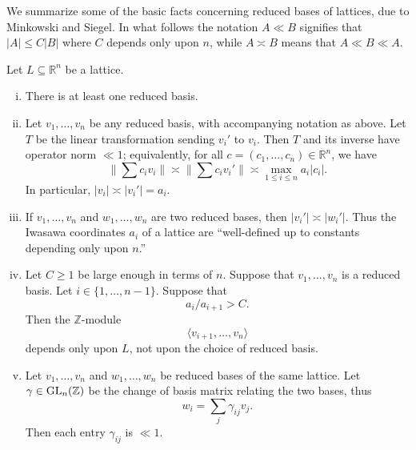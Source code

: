 \documentclass[reqno]{amsart} 
\begin{document}
We summarize some of the basic facts concerning reduced bases of lattices, due to Minkowski and Siegel.  In what follows the notation $A \ll B$ signifies that $|A| \leq C |B|$ where $C$ depends only upon $n$, while $A \asymp B$ means that $A \ll B \ll A$.
\begin{theorem}\label{thm:existence-reduced-basis}
  Let $L \subseteq \mathbb{R}^n$ be a lattice.
  \begin{enumerate} [(i)]
  \item\label{enumerate:cnjdp29fme} There is at least one reduced basis.
  \item\label{enumerate:cnjdp29gt9} Let $v_1,\dotsc,v_n$ be any reduced basis, with accompanying notation as above.  Let $T$ be the linear transformation sending $v_i'$ to $v_i$.  Then $T$ and its inverse have operator norm $\ll 1$; equivalently, for all $c = (c_1,\dotsc,c_n) \in \mathbb{R}^n$, we have
    \begin{equation}\label{eqn:reduced-basis-approx-orth}
      \|\sum c_i v_i\| \asymp
      \|\sum c_i v_i'\|
      \asymp \max_{1 \leq i \leq n} a_i |c_i|.
    \end{equation}
    In particular, $|v_i| \asymp |v_i'| = a_i$.
  \item\label{enumerate:cnjdp29o76} If $v_1,\dotsc,v_n$ and $w_1,\dotsc,w_n$ are two reduced bases, then $|v_i'| \asymp |w_i'|$.  Thus the Iwasawa coordinates $a_i$ of a lattice are ``well-defined up to constants depending only upon $n$.''
  \item\label{enumerate:cnjdp29qgg} Let $C \geq 1$ be large enough in terms of $n$.  Suppose that $v_1,\dotsc,v_n$ is a reduced basis.  Let $i \in \{1, \dotsc, n-1\}$.  Suppose that
    \begin{equation*}
      a_i / a_{i+1} > C.
    \end{equation*}
    Then the $\mathbb{Z}$-module
    \begin{equation*}
      \langle v_{i+1},\dotsc,v_n \rangle
    \end{equation*}
    depends only upon $L$, not upon the choice of reduced basis.
  \item\label{item:siegel-finitely-many-gamma} Let $v_1,\dotsc,v_n$ and $w_1,\dotsc,w_n$ be reduced bases of the same lattice.  Let $\gamma \in \operatorname{GL}_n(\mathbb{Z})$ be the change of basis matrix relating the two bases, thus
    \begin{equation*}
      w_i = \sum_{j} \gamma_{i j} v_j.
    \end{equation*}
    Then each entry $\gamma_{i j}$ is $\ll 1$.
  \end{enumerate}
\end{theorem}
\end{document}
